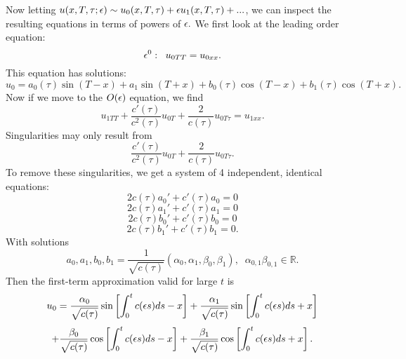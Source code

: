   Now letting $u(x,T,\tau;\epsilon)\sim u_0(x,T,\tau)+\epsilon u_1(x,T,\tau)+...$, we can inspect the resulting equations in terms of powers of $\epsilon.$ We first look at the leading order equation:
  $$\epsilon^0:\;\; u_{0TT}=u_{0xx}.$$
  This equation has solutions:
  $$u_0=a_0(\tau)\sin(T-x)+a_1\sin(T+x)+b_0(\tau)\cos(T-x)+b_1(\tau)\cos(T+x).$$
  Now if we move to the $O(\epsilon)$ equation, we find
  $$u_{1TT}+\frac{c'(\tau)}{c^2(\tau)}u_{0T}+\frac{2}{c(\tau)}u_{0T\tau}=u_{1xx}.$$
  Singularities may only result from
  $$\frac{c'(\tau)}{c^2(\tau)}u_{0T}+\frac{2}{c(\tau)}u_{0T\tau}.$$
  To remove these singularities, we get a system of 4 independent, identical equations:
  $$2 c(\tau)a_0'+c'(\tau)a_0=0$$
  $$2 c(\tau)a_1'+c'(\tau)a_1=0$$
  $$2 c(\tau)b_0'+c'(\tau)b_0=0$$
  $$2 c(\tau)b_1'+c'(\tau)b_1=0.$$
  With solutions
  $$a_0,a_1,b_0,b_1=\frac{1}{\sqrt{c(\tau)}}(\alpha_0,\alpha_1,\beta_0,\beta_1),\;\; \alpha_{0,1}\beta_{0,1}\in\mathbb{R}.$$
  Then the first-term approximation valid for large $t$ is
  $$u_0=\frac{\alpha_0}{\sqrt{c(\tau)}}\sin\left[\int_0^t c(\epsilon s)ds-x\right]+ \frac{\alpha_1}{\sqrt{c(\tau)}}\sin\left[\int_0^t c(\epsilon s)ds+x\right]$$
  $$+\frac{\beta_0}{\sqrt{c(\tau)}}\cos\left[\int_0^t c(\epsilon s)ds-x\right]+\frac{\beta_1}{\sqrt{c(\tau)}}\cos\left[\int_0^t c(\epsilon s)ds+x\right].$$

  \eenum
   